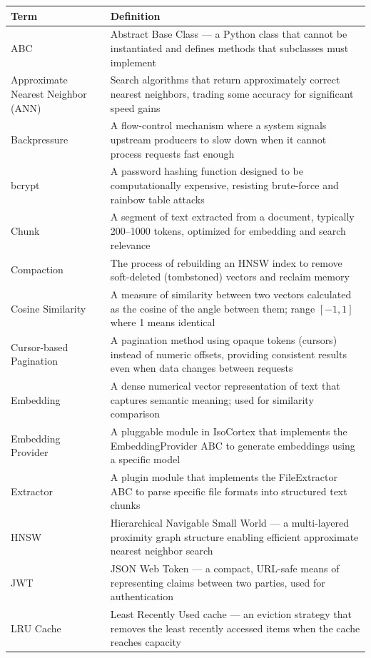 \documentclass[11pt,a4paper]{article}
\begin{document}
\begin{longtable}{@{}p{3.5cm}p{10cm}@{}}
\toprule
\textbf{Term} & \textbf{Definition} \\
\midrule
\endhead
ABC & Abstract Base Class --- a Python class that cannot be instantiated and defines methods that subclasses must implement \\
Approximate Nearest Neighbor (ANN) & Search algorithms that return approximately correct nearest neighbors, trading some accuracy for significant speed gains \\
Backpressure & A flow-control mechanism where a system signals upstream producers to slow down when it cannot process requests fast enough \\
bcrypt & A password hashing function designed to be computationally expensive, resisting brute-force and rainbow table attacks \\
Chunk & A segment of text extracted from a document, typically 200--1000 tokens, optimized for embedding and search relevance \\
Compaction & The process of rebuilding an HNSW index to remove soft-deleted (tombstoned) vectors and reclaim memory \\
Cosine Similarity & A measure of similarity between two vectors calculated as the cosine of the angle between them; range $[-1, 1]$ where 1 means identical \\
Cursor-based Pagination & A pagination method using opaque tokens (cursors) instead of numeric offsets, providing consistent results even when data changes between requests \\
Embedding & A dense numerical vector representation of text that captures semantic meaning; used for similarity comparison \\
Embedding Provider & A pluggable module in IsoCortex that implements the EmbeddingProvider ABC to generate embeddings using a specific model \\
Extractor & A plugin module that implements the FileExtractor ABC to parse specific file formats into structured text chunks \\
HNSW & Hierarchical Navigable Small World --- a multi-layered proximity graph structure enabling efficient approximate nearest neighbor search \\
JWT & JSON Web Token --- a compact, URL-safe means of representing claims between two parties, used for authentication \\
LRU Cache & Least Recently Used cache --- an eviction strategy that removes the least recently accessed items when the cache reaches capacity \\

\end{longtable}
\end{document}
